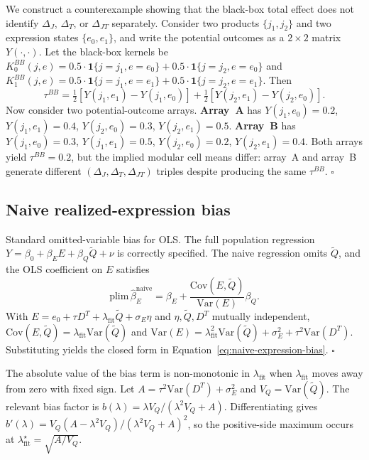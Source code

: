 \documentclass[11pt]{article}
\newcommand{\E}{E}
\newcommand{\Y}{Y}
\newcommand{\Q}{Q}
\newcommand{\Rreg}{D^T}
\newcommand{\dR}{\Delta_J}
\newcommand{\dP}{\Delta_T}
\newcommand{\dRP}{\Delta_{JT}}
\newcommand{\dtotal}{\tau^{BB}}
\newcommand{\KOS}{K^{BB}}
\begin{document}
We construct a counterexample showing that the black-box total effect does not identify $\dR$, $\dP$, or $\dRP$ separately. Consider two products $\{j_1, j_2\}$ and two expression states $\{e_0, e_1\}$, and write the potential outcomes as a $2 \times 2$ matrix $\Y(\cdot, \cdot)$. Let the black-box kernels be $\KOS_0(j, e) = 0.5 \cdot \mathbf{1}\{j = j_1, e = e_0\} + 0.5 \cdot \mathbf{1}\{j = j_2, e = e_0\}$ and $\KOS_1(j, e) = 0.5 \cdot \mathbf{1}\{j = j_1, e = e_1\} + 0.5 \cdot \mathbf{1}\{j = j_2, e = e_1\}$. Then
\[
\dtotal = \tfrac{1}{2}\!\left[\Y(j_1, e_1) - \Y(j_1, e_0)\right] + \tfrac{1}{2}\!\left[\Y(j_2, e_1) - \Y(j_2, e_0)\right].
\]
Now consider two potential-outcome arrays. \textbf{Array~A} has $\Y(j_1, e_0) = 0.2$, $\Y(j_1, e_1) = 0.4$, $\Y(j_2, e_0) = 0.3$, $\Y(j_2, e_1) = 0.5$. \textbf{Array~B} has $\Y(j_1, e_0) = 0.3$, $\Y(j_1, e_1) = 0.5$, $\Y(j_2, e_0) = 0.2$, $\Y(j_2, e_1) = 0.4$. Both arrays yield $\dtotal = 0.2$, but the implied modular cell means differ: array~A and array~B generate different $(\dR, \dP, \dRP)$ triples despite producing the same $\dtotal$. $\square$

\subsection{Naive realized-expression bias}\label{section:proof-naive}

Standard omitted-variable bias for OLS. The full population regression $\Y = \beta_0 + \beta_E \E + \beta_Q \tilde{\Q} + \nu$ is correctly specified. The naive regression omits $\tilde{\Q}$, and the OLS coefficient on $\E$ satisfies
\[
\mathrm{plim}\, \hat{\beta}_E^{\mathrm{naive}} = \beta_E + \frac{\mathrm{Cov}(\E, \tilde{\Q})}{\mathrm{Var}(\E)} \beta_Q.
\]
With $\E = e_0 + \tau \Rreg + \lambda_{\mathrm{fit}} \tilde{\Q} + \sigma_E \eta$ and $\eta, \tilde{\Q}, \Rreg$ mutually independent, $\mathrm{Cov}(\E, \tilde{\Q}) = \lambda_{\mathrm{fit}} \mathrm{Var}(\tilde{\Q})$ and $\mathrm{Var}(\E) = \lambda_{\mathrm{fit}}^2 \mathrm{Var}(\tilde{\Q}) + \sigma_E^2 + \tau^2 \mathrm{Var}(\Rreg)$. Substituting yields the closed form in Equation~\eqref{eq:naive-expression-bias}. $\square$

The absolute value of the bias term is non-monotonic in $\lambda_{\mathrm{fit}}$ when $\lambda_{\mathrm{fit}}$ moves away from zero with fixed sign. Let $A = \tau^2\mathrm{Var}(\Rreg)+\sigma_E^2$ and $V_Q=\mathrm{Var}(\tilde{\Q})$. The relevant bias factor is $b(\lambda)=\lambda V_Q/(\lambda^2 V_Q + A)$. Differentiating gives $b'(\lambda)=V_Q(A-\lambda^2V_Q)/(\lambda^2V_Q+A)^2$, so the positive-side maximum occurs at $\lambda_{\mathrm{fit}}^\star=\sqrt{A/V_Q}$.
\end{document}
